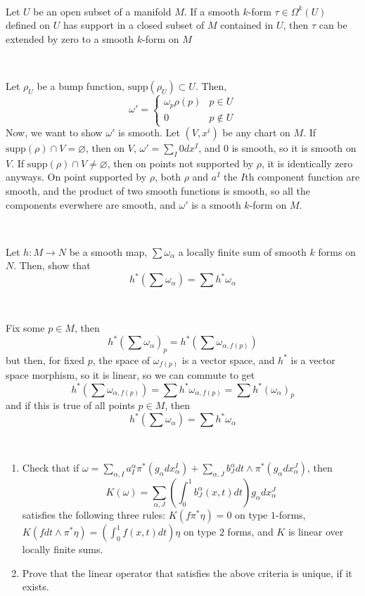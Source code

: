 \documentclass{article}
\begin{document}
\begin{exercise}[1]
\

Let $U$ be an open subset of a manifold $M$. If a smooth $k$-form $\tau \in \Omega^k(U)$ defined on $U$ has support in a closed subset of $M$ contained in $U$, then $\tau$ can be extended by zero to a smooth $k$-form on $M$
\end{exercise}

\begin{solution}
\

Let $\rho_U$ be a bump function, $\text{supp}(\rho_U) \subset U$. Then, $$\omega' = \begin{cases}
  \omega_p\rho(p) & p \in U\\
  0 & p \notin U
\end{cases}$$Now, we want to show $\omega'$ is smooth. Let $(V, x^i)$ be any chart on $M$. If $ \text{supp}(\rho) \cap V = \varnothing$, then on $V$, $\omega' = \sum_I 0 dx^I$, and $0$ is smooth, so it is smooth on $V$. If $\text{supp}(\rho) \cap V \neq \varnothing$, then on points not supported by $\rho$, it is identically zero anyways. On point supported by $\rho$, both $\rho$ and $a^I$ the $I$th component function are smooth, and the product of two smooth functions is smooth, so all the components everwhere are smooth, and $\omega'$ is a smooth $k$-form on $M$.
\end{solution}

\begin{exercise}[2]
\

Let $h: M \to N$ be a smooth map, $\sum \omega_\alpha$ a locally finite sum of smooth $k$ forms on $N$. Then, show that $$h^*(\sum \omega_\alpha) = \sum h^*\omega_\alpha$$
\end{exercise}

\begin{solution}
\

Fix some $p \in M$, then $$h^*(\sum \omega_\alpha)_p = h^*(\sum \omega_{\alpha, f(p)})$$but then, for fixed $p$, the space of $\omega_{f(p)}$ is a vector space, and $h^*$ is a vector space morphism, so it is linear, so we can commute to get $$h^*(\sum \omega_{\alpha, f(p)}) = \sum h^*\omega_{\alpha, f(p)} = \sum h^*(\omega_\alpha)_p$$and if this is true of all points $p \in M$, then $$h^*(\sum \omega_\alpha) = \sum h^*\omega_\alpha$$
\end{solution}

\begin{exercise}[3]
\

\begin{enumerate}
  \item Check that if $\omega = \sum_{\alpha, I} a_I^\alpha \pi^*(g_\alpha dx^I_\alpha) + \sum_{\alpha, J} b_J^\alpha dt \wedge \pi^*(g_\alpha dx^J_\alpha)$, then $$K(\omega) = \sum_{\alpha, J} (\int_0^1 b_J^\alpha(x,t) dt)g_\alpha dx_\alpha^J$$satisfies the following three rules: $K(f\pi^*\eta) = 0$ on type $1$-forms, $K(f dt \wedge \pi^*\eta) = (\int_0^1 f(x,t)dt)\eta$ on type $2$ forms, and $K$ is linear over locally finite sums.
  \item Prove that the linear operator that satisfies the above criteria is unique, if it exists.
\end{enumerate}
\end{exercise}
\end{document}
